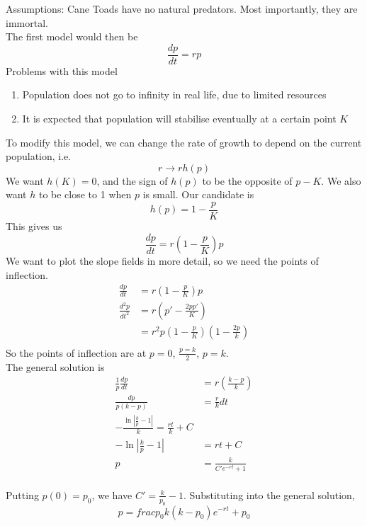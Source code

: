 \documentclass[12pt]{article}
\begin{document}
Assumptions: Cane Toads have no natural predators. Most importantly, they are immortal. \\
The first model would then be
$$\frac{dp}{dt} = rp$$
Problems with this model
\begin{enumerate}
	\item Population does not go to infinity in real life, due to limited resources \\
	\item It is expected that population will stabilise eventually at a certain point $K$ \\
\end{enumerate}
To modify this model, we can change the rate of growth to depend on the current population, i.e.
$$r \rightarrow rh(p)$$
We want $h(K) = 0$, and the sign of $h(p)$ to be the opposite of $p-K$. We also want $h$ to be close to 1 when $p$ is small. Our candidate is
$$h(p) = 1 - \frac{p}{K}$$
This gives us
$$\frac{dp}{dt} = r\left(1 - \frac{p}{K}\right)p$$
We want to plot the slope fields in more detail, so we need the points of inflection.
\begin{align*}
	\frac{dp}{dt} &= r\left(1 - \frac{p}{K}\right)p \\
	\frac{d^2p}{dt^2} &= r\left(p' - \frac{2pp'}{K}\right) \\
			  &= r^2p \left(1 - \frac{p}{K}\right)\left(1 - \frac{2p}{k}\right) \\
\end{align*}
So the points of inflection are at $p=0$, $\frac{p=k}{2}$, $p=k$. \\
The general solution is
\begin{align*}
	\frac{1}{p} \frac{dp}{dt} &= r\left(\frac{k-p}{k}\right) \\
	\frac{dp}{p(k-p)} &= \frac{r}{k} dt \\
	- \frac{\ln\left| \frac{k}{p} - 1\right|}{k} = \frac{rt}{k} + C \\
	-\ln\left| \frac{k}{p} - 1 \right| &= rt + C \\
	p &= \frac{k}{C'e^{-rt}+1} \\
\end{align*}

Putting $p(0) = p_0$, we have $C' = \frac{k}{p_0} - 1$. Substituting into the general solution,
$$p = frac{p_0k}{(k-p_0)e^{-rt}+p_0}$$
\end{document}
